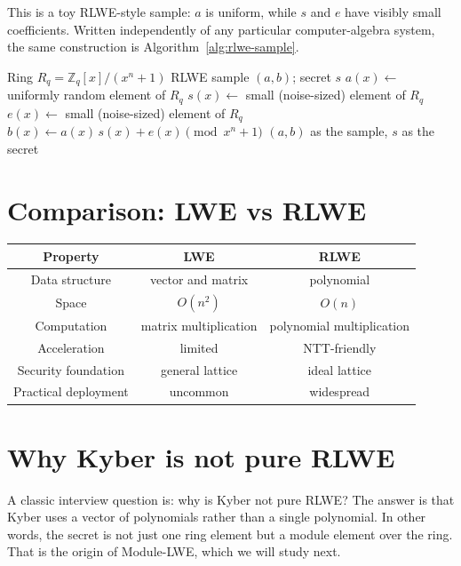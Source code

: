 This is a toy RLWE-style sample: $a$ is uniform, while $s$ and $e$ have visibly small coefficients. Written independently of any particular computer-algebra system, the same construction is Algorithm~\ref{alg:rlwe-sample}.

\begin{algorithm}[H]
\caption{Generate an RLWE Sample}
\label{alg:rlwe-sample}
\begin{algorithmic}[1]
\Require Ring $R_q = \mathbb{Z}_q[x]/(x^n+1)$
\Ensure RLWE sample $(a,b)$; secret $s$
\State $a(x) \gets$ uniformly random element of $R_q$
\State $s(x) \gets$ small (noise-sized) element of $R_q$ 
\State $e(x) \gets$ small (noise-sized) element of $R_q$ 
\State $b(x) \gets a(x)\,s(x) + e(x) \pmod{x^n+1}$
\State \Return $(a,b)$ as the sample, $s$ as the secret
\end{algorithmic}
\end{algorithm}

\section{Comparison: LWE vs RLWE}

\begin{table}[h]
\centering
\begin{tabular}{|c|c|c|}
\hline
Property & LWE & RLWE \\
\hline
Data structure & vector and matrix & polynomial \\
\hline
Space & $O(n^2)$ & $O(n)$ \\
\hline
Computation & matrix multiplication & polynomial multiplication \\
\hline
Acceleration & limited & NTT-friendly \\
\hline
Security foundation & general lattice & ideal lattice \\
\hline
Practical deployment & uncommon & widespread \\
\hline
\end{tabular}
\end{table}

\section{Why Kyber is not pure RLWE}

A classic interview question is: why is Kyber not pure RLWE? The answer is that Kyber uses a vector of polynomials rather than a single polynomial. In other words, the secret is not just one ring element but a module element over the ring. That is the origin of Module-LWE, which we will study next.

